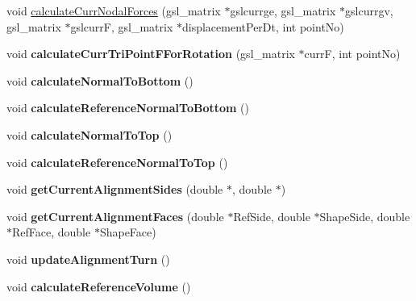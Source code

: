 \begin{DoxyCompactItemize}
\item 
void \hyperlink{classPrism_a606fbf422f9d652e0f697ea93dc2e088}{calculate\+Curr\+Nodal\+Forces} (gsl\+\_\+matrix $\ast$gslcurrge, gsl\+\_\+matrix $\ast$gslcurrgv, gsl\+\_\+matrix $\ast$gslcurr\+F, gsl\+\_\+matrix $\ast$displacement\+Per\+Dt, int point\+No)
\item 
\hypertarget{classPrism_ae9403142a217a005a4d588a6e472be27}{}void {\bfseries calculate\+Curr\+Tri\+Point\+F\+For\+Rotation} (gsl\+\_\+matrix $\ast$curr\+F, int point\+No)\label{classPrism_ae9403142a217a005a4d588a6e472be27}

\item 
\hypertarget{classPrism_a872ce1e6304b1400d2d0e712af2a0131}{}void {\bfseries calculate\+Normal\+To\+Bottom} ()\label{classPrism_a872ce1e6304b1400d2d0e712af2a0131}

\item 
\hypertarget{classPrism_a2d8821dcd96009c95f06f34ee23ede7e}{}void {\bfseries calculate\+Reference\+Normal\+To\+Bottom} ()\label{classPrism_a2d8821dcd96009c95f06f34ee23ede7e}

\item 
\hypertarget{classPrism_ac3b85296d366eb4dd67406228c519caf}{}void {\bfseries calculate\+Normal\+To\+Top} ()\label{classPrism_ac3b85296d366eb4dd67406228c519caf}

\item 
\hypertarget{classPrism_a41a101de7bb2f75c5f9b44de23187593}{}void {\bfseries calculate\+Reference\+Normal\+To\+Top} ()\label{classPrism_a41a101de7bb2f75c5f9b44de23187593}

\item 
\hypertarget{classPrism_a6144314003601a688d81b0389ea1114e}{}void {\bfseries get\+Current\+Alignment\+Sides} (double $\ast$, double $\ast$)\label{classPrism_a6144314003601a688d81b0389ea1114e}

\item 
\hypertarget{classPrism_ab5fa417d944a6903b5bc9d2f53d4616a}{}void {\bfseries get\+Current\+Alignment\+Faces} (double $\ast$Ref\+Side, double $\ast$Shape\+Side, double $\ast$Ref\+Face, double $\ast$Shape\+Face)\label{classPrism_ab5fa417d944a6903b5bc9d2f53d4616a}

\item 
\hypertarget{classPrism_a4472375144e5e38a912af1fb4e2cc2d1}{}void {\bfseries update\+Alignment\+Turn} ()\label{classPrism_a4472375144e5e38a912af1fb4e2cc2d1}

\item 
\hypertarget{classPrism_a4ea58fd729a2bbef20530200978a8f75}{}void {\bfseries calculate\+Reference\+Volume} ()\label{classPrism_a4ea58fd729a2bbef20530200978a8f75}


\end{DoxyCompactItemize}
